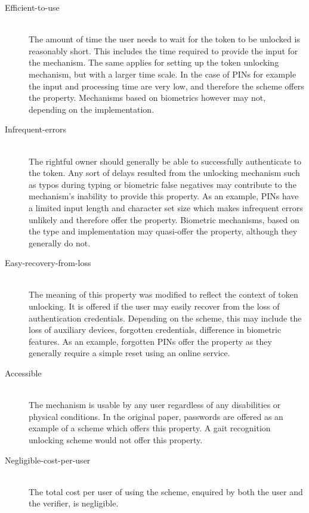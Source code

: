 \begin{description}
  \item[Efficient-to-use] \hfill \\
  The amount of time the user needs to wait for the token to be unlocked is reasonably short. This includes the time required to provide the input for the mechanism. The same applies for setting up the token unlocking mechanism, but with a larger time scale. In the case of PINs for example the input and processing time are very low, and therefore the scheme offers the property. Mechanisms based on biometrics however may not, depending on the implementation.
  
  \item[Infrequent-errors] \hfill \\
  The rightful owner should generally be able to successfully authenticate to the token. Any sort of delays resulted from the unlocking mechanism such as typos during typing or biometric false negatives may contribute to the mechanism's inability to provide this property. As an example, PINs have a limited input length and character set size which makes infrequent errors unlikely and therefore offer the property. Biometric mechanisms, based on the type and implementation may quasi-offer the property, although they generally do not.
    
  \item[Easy-recovery-from-loss] \hfill \\ 
  The meaning of this property was modified to reflect the context of token unlocking. It is offered if the user may easily recover from the loss of authentication credentials. Depending on the scheme, this may include the loss of auxiliary devices, forgotten credentials, difference in biometric features. As an example, forgotten PINs offer the property as they generally require a simple reset using an online service.
  
  \item[Accessible] \hfill \\
  The mechanism is usable by any user regardless of any disabilities or physical conditions. In the original paper, passwords are offered as an example of a scheme which offers this property. A gait recognition unlocking scheme would not offer this property. 
  
  \item[Negligible-cost-per-user] \hfill \\
  The total cost per user of using the scheme, enquired by both the user and the verifier, is negligible.
  

\end{description}
